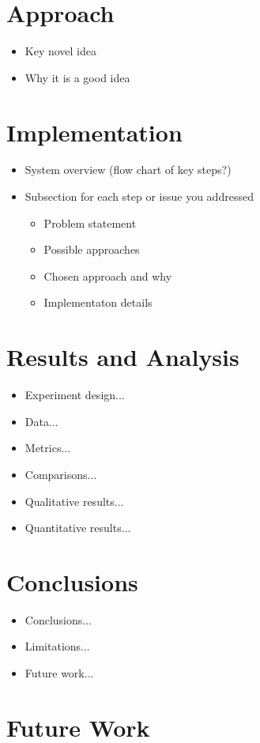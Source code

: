 \documentclass[pageno]{jpaper}
\begin{document}
\section{Approach}
\begin{itemize}
\item Key novel idea
\item Why it is a good idea
\end{itemize}

\section{Implementation}
\begin{itemize}
\item System overview (flow chart of key steps?)
\item Subsection for each step or issue you addressed
\begin{itemize}
\item Problem statement
\item Possible approaches
\item Chosen approach and why
\item Implementaton details
\end{itemize}
\end{itemize}

\section{Results and Analysis}
\begin{itemize}
\item Experiment design...
\item Data...
\item Metrics...
\item Comparisons...
\item Qualitative results...
\item Quantitative results...
\end{itemize}

\section{Conclusions}
\begin{itemize}
\item Conclusions...
\item Limitations...
\item Future work...
\end{itemize}

\section{Future Work}
\nocite{*}


\end{document}

